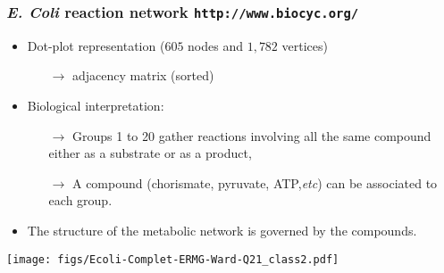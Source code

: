 \documentclass{beamer}
\begin{document}
\begin{frame}
  \frametitle{\emph{E. Coli} reaction network \texttt{http://www.biocyc.org/}}
  \begin{minipage}{.5\linewidth}
    \begin{itemize}
    \item Dot-plot representation ($605$ nodes and $1,782$ vertices)
      \begin{itemize}
      \item[\bf{$\rightarrow$}] adjacency matrix (sorted)
      \end{itemize}
    \item Biological interpretation:
      \begin{itemize}
      \item[\bf{$\rightarrow$}] Groups 1 to 20 gather reactions
        involving all the \alert{same compound} either as a substrate or
        as a product,
      \item[\bf{$\rightarrow$}] A compound (chorismate, pyruvate,
        ATP,\emph{etc}) can be associated to each group.
      \end{itemize}
    \item The structure of the metabolic network is governed by the
      compounds.
    \end{itemize}
  \end{minipage}%
  \begin{minipage}{.5\linewidth}
    \begin{center}
      \texttt{[image: figs/Ecoli-Complet-ERMG-Ward-Q21\_class2.pdf]}
    \end{center}
  \end{minipage}%

\end{frame}
\end{document}
